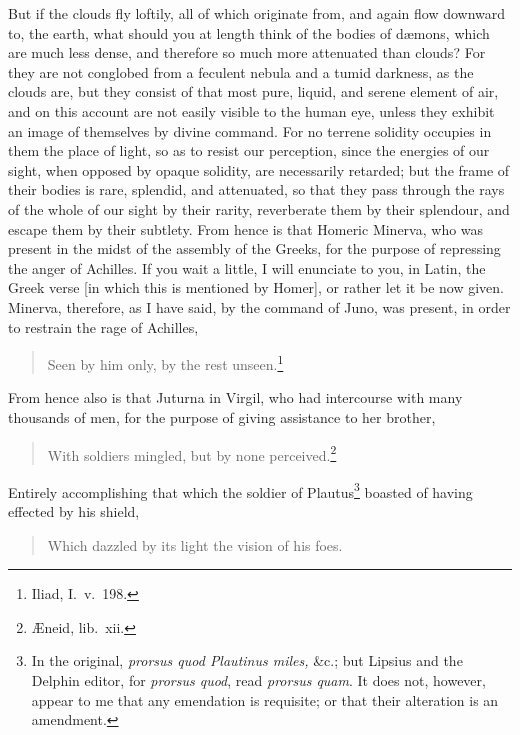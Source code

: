 \documentclass{article}
\begin{document}
\noindent But if the clouds fly loftily, all of which originate from, and again
flow downward to, the earth, what should you at length think of the bodies of
d{\ae}mons, which are much less dense, and therefore so much more attenuated
than clouds? For they are not conglobed from a feculent nebula and a tumid
darkness, as the clouds are, but they consist of that most pure, liquid, and
serene element of air, and on this account are not easily visible to the human
eye, unless they exhibit an image of themselves by divine command. For no
terrene solidity occupies in them the place of light, so as to resist our
perception, since the energies of our sight, when opposed by opaque solidity,
are necessarily retarded; but the frame of their bodies is rare, splendid, and
attenuated, so that they pass through the rays of the whole of our sight by
their rarity, reverberate them by their splendour, and escape them by their
subtlety. From hence is that Homeric Minerva, who was present in the midst of
the assembly of the Greeks, for the purpose of repressing the anger of
Achilles. If you wait a little, I will enunciate to you, in Latin, the Greek
verse [in which this is mentioned by Homer], or rather let it be now given.
Minerva, therefore, as I have said, by the command of Juno, was present, in
order to restrain the rage of Achilles,

\begin{verse}
Seen by him only, by the rest unseen.\footnote{Iliad, I.~v.~198.}
\end{verse}

\noindent From hence also is that Juturna in Virgil, who had intercourse
with many thousands of men, for the purpose of
giving assistance to her brother,

\begin{verse}
With soldiers mingled, but by none perceived.\footnote{{\AE}neid, lib.~xii.}
\end{verse}

\noindent Entirely accomplishing that which the soldier of Plautus\footnote{In
the original, \textit{prorsus quod Plautinus miles,} \&c.; but Lipsius and the
Delphin editor, for \textit{prorsus quod}, read \textit{prorsus quam}. It does
not, however, appear to me that any emendation is requisite; or that
their alteration is an amendment.} boasted of having effected by his shield,

\begin{verse}
Which dazzled by its light the vision of his foes.
\end{verse}
\end{document}
